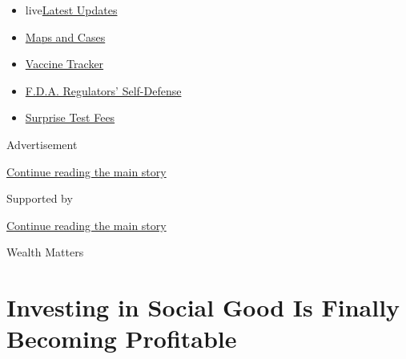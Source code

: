 \begin{itemize}
\tightlist
\item
  live\href{https://www.nytimes3xbfgragh.onion/2020/09/12/world/covid-19-coronavirus.html?name=styln-coronavirus-national\&region=TOP_BANNER\&block=storyline_menu_recirc\&action=click\&pgtype=Article\&impression_id=47cced40-f52c-11ea-bc41-9ff49d9e873a\&variant=undefined}{Latest
  Updates}
\item
  \href{https://www.nytimes3xbfgragh.onion/interactive/2020/us/coronavirus-us-cases.html?name=styln-coronavirus-national\&region=TOP_BANNER\&block=storyline_menu_recirc\&action=click\&pgtype=Article\&impression_id=47cced41-f52c-11ea-bc41-9ff49d9e873a\&variant=undefined}{Maps
  and Cases}
\item
  \href{https://www.nytimes3xbfgragh.onion/interactive/2020/science/coronavirus-vaccine-tracker.html?name=styln-coronavirus-national\&region=TOP_BANNER\&block=storyline_menu_recirc\&action=click\&pgtype=Article\&impression_id=47cced42-f52c-11ea-bc41-9ff49d9e873a\&variant=undefined}{Vaccine
  Tracker}
\item
  \href{https://www.nytimes3xbfgragh.onion/2020/09/10/us/politics/fda-coronavirus-vaccine.html?name=styln-coronavirus-national\&region=TOP_BANNER\&block=storyline_menu_recirc\&action=click\&pgtype=Article\&impression_id=47cced43-f52c-11ea-bc41-9ff49d9e873a\&variant=undefined}{F.D.A.
  Regulators' Self-Defense}
\item
  \href{https://www.nytimes3xbfgragh.onion/2020/09/09/upshot/coronavirus-surprise-test-fees.html?name=styln-coronavirus-national\&region=TOP_BANNER\&block=storyline_menu_recirc\&action=click\&pgtype=Article\&impression_id=47cced44-f52c-11ea-bc41-9ff49d9e873a\&variant=undefined}{Surprise
  Test Fees}
\end{itemize}

Advertisement

\protect\hyperlink{after-top}{Continue reading the main story}

Supported by

\protect\hyperlink{after-sponsor}{Continue reading the main story}

Wealth Matters

\hypertarget{investing-in-social-good-is-finally-becoming-profitable}{%
\section{Investing in Social Good Is Finally Becoming
Profitable}\label{investing-in-social-good-is-finally-becoming-profitable}}

